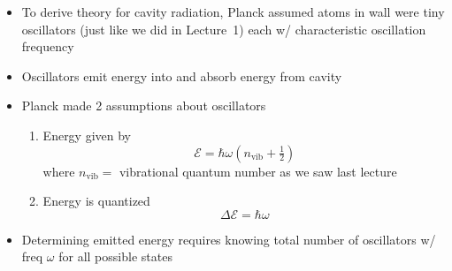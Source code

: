 \documentclass[11pt, oneside]{article}
\begin{document}
\begin{itemize}
	\item To derive theory for cavity radiation, Planck assumed atoms in wall were tiny oscillators (just like we did in Lecture~1) each w/ characteristic oscillation frequency
	\item Oscillators emit energy into and absorb energy from cavity
	\item Planck made 2 assumptions about oscillators
	\begin{enumerate}
		\item Energy given by
		\begin{equation}
			\label{e:Eosc}
			\mathcal{E} = \hbar\omega\left(n_\mathrm{vib} + \tfrac{1}{2}\right)
		\end{equation}
		where $n_\mathrm{vib} =$ vibrational quantum number as we saw last lecture
		\item Energy is quantized
		\begin{equation}
			\label{e:dE}
			\Delta\mathcal{E} = \hbar\omega
		\end{equation}
	\end{enumerate}
	\item Determining emitted energy requires knowing total number of oscillators w/ freq $\omega$ for all possible states

\end{itemize}
\end{document}
